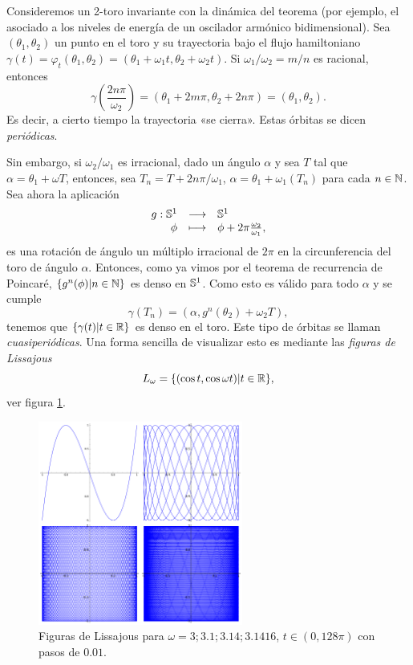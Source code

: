 \begin{obs}
  Consideremos un 2-toro invariante con la dinámica del teorema (por ejemplo, el asociado a los niveles de energía de un oscilador armónico bidimensional). Sea $(\theta_1,\theta_2)$ un punto en el toro y su trayectoria bajo el flujo hamiltoniano $\gamma(t)=\varphi_t(\theta_1,\theta_2)=(\theta_1+\omega_1t,\theta_2+\omega_2t)$. Si $\omega_1/\omega_2=m/n$ es racional, entonces 
  \begin{equation*}
    \gamma\left(\frac{2n\pi}{\omega_2}\right) = (\theta_1+2m\pi,\theta_2+2n\pi)=(\theta_1,\theta_2).
  \end{equation*}
  Es decir, a cierto tiempo la trayectoria «se cierra». Estas órbitas se dicen \emph{periódicas}. 
 
  Sin embargo, si $\omega_2/\omega_1$ es irracional, dado un ángulo $\alpha$ y sea $T$ tal que $\alpha=\theta_1+\omega T$, entonces, sea $T_n=T+2n\pi/\omega_1$, $\alpha=\theta_1+\omega_1(T_n)$ para cada $n\in \mathbb{N}$. Sea ahora la aplicación
  \begin{equation*}
    \begin{array}{rcl}
    g:\mathbb{S}^1 & \longrightarrow &\mathbb{S}^1 \\
  \phi & \longmapsto & \phi + 2\pi\frac{\omega_2}{\omega_1},
  \end{array}
\end{equation*}
es una rotación de ángulo un múltiplo irracional de $2\pi$ en la circunferencia del toro de ángulo $\alpha$. Entonces, como ya vimos por el teorema de recurrencia de Poincaré, $\{g^n(\phi)|n\in \mathbb{N}\}$ es denso en $\mathbb{S}^1$. Como esto es válido para todo $\alpha$ y se cumple 
\begin{equation*}
  \gamma(T_n)=(\alpha,g^n(\theta_2)+\omega_2 T),
\end{equation*}
tenemos que $\{\gamma(t)|t \in \mathbb{R} \}$ es denso en el toro. Este tipo de órbitas se llaman \emph{cuasiperiódicas}. Una forma sencilla de visualizar esto es mediante las \emph{figuras de Lissajous} 
\begin{equation*}
  L_{\omega}=\{(\cos t, \cos \omega t) | t \in \mathbb{R}\},
\end{equation*}
ver figura \ref{fig:lissajous}.
\begin{figure}[h]
  \centering
  \includegraphics[width=0.6\textwidth]{pics/lissajous}
  \caption{Figuras de Lissajous para $\omega=3;3.1;3.14;3.1416$, $t \in (0,128\pi)$ con pasos de $0.01$.}
  \label{fig:lissajous}
\end{figure}
\end{obs}

